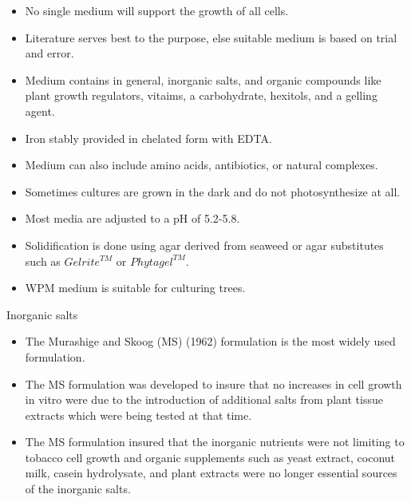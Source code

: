 \documentclass[ignorenonframetext,aspectratio=169]{beamer}
\providecommand{\tightlist}{%
  \setlength{\itemsep}{0pt}\setlength{\parskip}{0pt}}
\begin{document}
\begin{itemize}
\tightlist
\item
  No single medium will support the growth of all cells.
\item
  Literature serves best to the purpose, else suitable medium is based
  on trial and error.
\item
  Medium contains in general, inorganic salts, and organic compounds
  like plant growth regulators, vitaims, a carbohydrate, hexitols, and a
  gelling agent.
\item
  Iron stably provided in chelated form with EDTA.
\item
  Medium can also include amino acids, antibiotics, or natural
  complexes.
\item
  Sometimes cultures are grown in the dark and do not photosynthesize at
  all.
\item
  Most media are adjusted to a pH of 5.2-5.8.
\item
  Solidification is done using agar derived from seaweed or agar
  substitutes such as \(Gelrite^{TM}\) or \(Phytagel^{TM}\).
\item
  WPM medium is suitable for culturing trees.
\end{itemize}

\begin{frame}{Inorganic salts}
\protect\hypertarget{inorganic-salts}{}

\begin{itemize}
\tightlist
\item
  The Murashige and Skoog (MS) (1962) formulation is the most widely
  used formulation.
\item
  The MS formulation was developed to insure that no increases in cell
  growth in vitro were due to the introduction of additional salts from
  plant tissue extracts which were being tested at that time.
\item
  The MS formulation insured that the inorganic nutrients were not
  limiting to tobacco cell growth and organic supplements such as yeast
  extract, coconut milk, casein hydrolysate, and plant extracts were no
  longer essential sources of the inorganic salts.
\end{itemize}

\end{frame}
\end{document}
